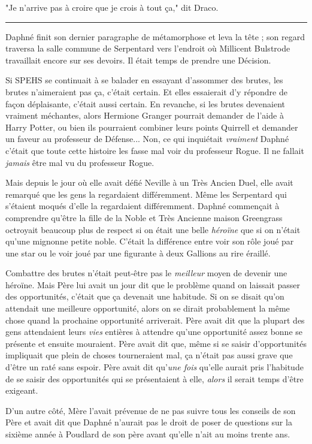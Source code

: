 "Je n'arrive pas à croire que je crois à tout ça," dit Draco.
\par\noindent\rule{\textwidth}{0.4pt}
Daphné finit son dernier paragraphe de métamorphose et leva la tête ; son regard traversa la salle commune de Serpentard vers l'endroit où Millicent Bulstrode travaillait encore sur ses devoirs. Il était temps de prendre une Décision.

Si SPEHS se continuait à se balader en essayant d'assommer des brutes, les brutes n'aimeraient pas ça, c'était certain. Et elles essaierait d'y répondre de façon déplaisante, c'était aussi certain. En revanche, si les brutes devenaient vraiment méchantes, alors Hermione Granger pourrait demander de l'aide à Harry Potter, ou bien ils pourraient combiner leurs points Quirrell et demander un faveur au professeur de Défense... Non, ce qui inquiétait \emph{vraiment}  Daphné c'était que toute cette histoire les fasse mal voir du professeur Rogue. Il ne fallait \emph{jamais}  être mal vu du professeur Rogue.

Mais depuis le jour où elle avait défié Neville à un Très Ancien Duel, elle avait remarqué que les gens la regardaient différemment. Même les Serpentard qui s'étaient moqués d'elle la regardaient différemment. Daphné commençait à comprendre qu'être la fille de la Noble et Très Ancienne maison Greengrass octroyait beaucoup plus de respect si on était une belle \emph{héroïne}  que si on n'était qu'une mignonne petite noble. C'était la différence entre voir son rôle joué par une star ou le voir joué par une figurante à deux Gallions au rire éraillé.

Combattre des brutes n'était peut-être pas le \emph{meilleur}  moyen de devenir une héroïne. Mais Père lui avait un jour dit que le problème quand on laissait passer des opportunités, c'était que ça devenait une habitude. Si on se disait qu'on attendait une meilleure opportunité, alors on se dirait probablement la même chose quand la prochaine opportunité arriverait. Père avait dit que la plupart des gens attendaient leurs \emph{vies}  entières à attendre qu'une opportunité assez bonne se présente et ensuite mouraient. Père avait dit que, même si se saisir d'opportunités impliquait que plein de choses tourneraient mal, ça n'était pas aussi grave que d'être un raté sans espoir. Père avait dit qu'\emph{une fois}  qu'elle aurait pris l'habitude de se saisir des opportunités qui se présentaient à elle, \emph{alors}  il serait temps d'être exigeant.

D'un autre côté, Mère l'avait prévenue de ne pas suivre tous les conseils de son Père et avait dit que Daphné n'aurait pas le droit de poser de questions sur la sixième année à Poudlard de son père avant qu'elle n'ait au moins trente ans.

